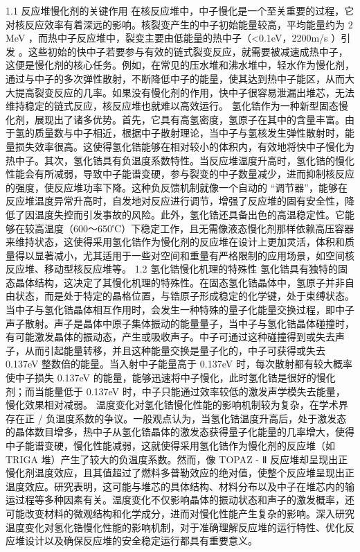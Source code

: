 1.1 反应堆慢化剂的关键作用
在核反应堆中，中子慢化是一个至关重要的过程，它对核反应效率有着深远的影响。核裂变产生的中子初始能量较高，平均能量约为 2 MeV ，而热中子反应堆中，裂变主要由低能量的热中子（<0.1eV，2200m/s ）引发 。这些初始的快中子若要参与有效的链式裂变反应，就需要被减速成热中子，这便是慢化剂的核心任务。例如，在常见的压水堆和沸水堆中，轻水作为慢化剂，通过与中子的多次弹性散射，不断降低中子的能量，使其达到热中子能区，从而大大提高裂变反应的几率。如果没有慢化剂的作用，快中子很容易泄漏出堆芯，无法维持稳定的链式反应，核反应堆也就难以高效运行。
氢化锆作为一种新型固态慢化剂，展现出了诸多优势。首先，它具有高氢密度，氢原子在其中的含量丰富。由于氢的质量数与中子相近，根据中子散射理论，当中子与氢核发生弹性散射时，能量损失效率很高。这使得氢化锆能够在相对较小的体积内，有效地将快中子慢化为热中子。其次，氢化锆具有负温度系数特性。当反应堆温度升高时，氢化锆的慢化性能会有所减弱，导致中子能谱变硬，参与裂变的中子数量减少，进而抑制核反应的强度，使反应堆功率下降。这种负反馈机制就像一个自动的 “调节器”，能够在反应堆温度异常升高时，自发地对反应进行调节，增强了反应堆的固有安全性，降低了因温度失控而引发事故的风险。此外，氢化锆还具备出色的高温稳定性。它能够在较高温度（600～650℃）下稳定工作，且无需像液态慢化剂那样依赖高压容器来维持状态，这使得采用氢化锆作为慢化剂的反应堆在设计上更加灵活，体积和质量得以显著减小，尤其适用于一些对空间和重量有严格限制的应用场景，如空间核反应堆、移动型核反应堆等。
1.2 氢化锆慢化机理的特殊性
氢化锆具有独特的固态晶体结构，这决定了其慢化机理的特殊性。在固态氢化锆晶体中，氢原子并非自由状态，而是处于特定的晶格位置，与锆原子形成稳定的化学键，处于束缚状态。当中子与氢化锆晶体相互作用时，会发生一种特殊的量子化能量交换过程，即中子声子散射。声子是晶体中原子集体振动的能量量子，当中子与氢化锆晶体碰撞时，有可能激发晶体的振动态，产生或吸收声子。中子可通过这种碰撞得到或失去声子，从而引起能量转移，并且这种能量交换是量子化的，中子可获得或失去 0.137eV 整数倍的能量。当入射中子能量高于 0.137eV 时，每次散射都有较大概率使中子损失 0.137eV 的能量，能够迅速将中子慢化，此时氢化锆是很好的慢化剂；而当能量低于 0.137eV 时，中子只能通过效率较低的激发声学模失去能量，慢化效果相对减弱。
温度变化对氢化锆慢化性能的影响机制较为复杂，在学术界存在正 / 负温度系数的争议。一般观点认为，当氢化锆温度升高后，处于激发态的晶体数目增多，热中子从氢化锆晶体的激发态获得量子化能量的几率增大，使得中子能谱变硬，慢化性能减弱，这就使得采用氢化锆作为慢化剂的反应堆（如 TRIGA 堆）产生了较大的负温度系数。然而，像 TOPAZ - Ⅱ 反应堆却呈现出正慢化剂温度效应，且其值超过了燃料多普勒效应的绝对值，使整个反应堆呈现出正温度效应。研究表明，这可能与堆芯的具体结构、材料分布以及中子在堆芯内的输运过程等多种因素有关。温度变化不仅影响晶体的振动状态和声子的激发概率，还可能改变材料的微观结构和化学成分，进而对慢化性能产生复杂的影响。深入研究温度变化对氢化锆慢化性能的影响机制，对于准确理解反应堆的运行特性、优化反应堆设计以及确保反应堆的安全稳定运行都具有重要意义。
